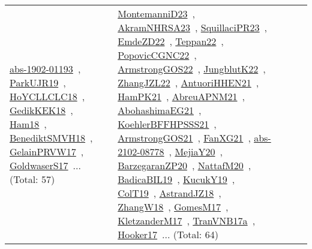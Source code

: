 {\begin{longtable}{lp{3cm}>{\raggedright\arraybackslash}p{6cm}>{\raggedright\arraybackslash}p{6cm}>{\raggedright\arraybackslash}p{8cm}}
\href{works/abs-1902-01193.pdf}{abs-1902-01193}~\cite{abs-1902-01193}, \href{works/ParkUJR19.pdf}{ParkUJR19}~\cite{ParkUJR19}, \href{works/HoYCLLCLC18.pdf}{HoYCLLCLC18}~\cite{HoYCLLCLC18}, \href{works/GedikKEK18.pdf}{GedikKEK18}~\cite{GedikKEK18}, \href{works/Ham18.pdf}{Ham18}~\cite{Ham18}, \href{works/BenediktSMVH18.pdf}{BenediktSMVH18}~\cite{BenediktSMVH18}, \href{works/GelainPRVW17.pdf}{GelainPRVW17}~\cite{GelainPRVW17}, \href{works/GoldwaserS17.pdf}{GoldwaserS17}~\cite{GoldwaserS17}... (Total: 57) & \href{works/MontemanniD23.pdf}{MontemanniD23}~\cite{MontemanniD23}, \href{works/AkramNHRSA23.pdf}{AkramNHRSA23}~\cite{AkramNHRSA23}, \href{works/SquillaciPR23.pdf}{SquillaciPR23}~\cite{SquillaciPR23}, \href{works/EmdeZD22.pdf}{EmdeZD22}~\cite{EmdeZD22}, \href{works/Teppan22.pdf}{Teppan22}~\cite{Teppan22}, \href{works/PopovicCGNC22.pdf}{PopovicCGNC22}~\cite{PopovicCGNC22}, \href{works/ArmstrongGOS22.pdf}{ArmstrongGOS22}~\cite{ArmstrongGOS22}, \href{works/JungblutK22.pdf}{JungblutK22}~\cite{JungblutK22}, \href{works/ZhangJZL22.pdf}{ZhangJZL22}~\cite{ZhangJZL22}, \href{works/AntuoriHHEN21.pdf}{AntuoriHHEN21}~\cite{AntuoriHHEN21}, \href{works/HamPK21.pdf}{HamPK21}~\cite{HamPK21}, \href{works/AbreuAPNM21.pdf}{AbreuAPNM21}~\cite{AbreuAPNM21}, \href{works/AbohashimaEG21.pdf}{AbohashimaEG21}~\cite{AbohashimaEG21}, \href{works/KoehlerBFFHPSSS21.pdf}{KoehlerBFFHPSSS21}~\cite{KoehlerBFFHPSSS21}, \href{works/ArmstrongGOS21.pdf}{ArmstrongGOS21}~\cite{ArmstrongGOS21}, \href{works/FanXG21.pdf}{FanXG21}~\cite{FanXG21}, \href{works/abs-2102-08778.pdf}{abs-2102-08778}~\cite{abs-2102-08778}, \href{works/MejiaY20.pdf}{MejiaY20}~\cite{MejiaY20}, \href{works/BarzegaranZP20.pdf}{BarzegaranZP20}~\cite{BarzegaranZP20}, \href{works/NattafM20.pdf}{NattafM20}~\cite{NattafM20}, \href{works/BadicaBIL19.pdf}{BadicaBIL19}~\cite{BadicaBIL19}, \href{works/KucukY19.pdf}{KucukY19}~\cite{KucukY19}, \href{works/ColT19.pdf}{ColT19}~\cite{ColT19}, \href{works/AstrandJZ18.pdf}{AstrandJZ18}~\cite{AstrandJZ18}, \href{works/ZhangW18.pdf}{ZhangW18}~\cite{ZhangW18}, \href{works/GomesM17.pdf}{GomesM17}~\cite{GomesM17}, \href{works/KletzanderM17.pdf}{KletzanderM17}~\cite{KletzanderM17}, \href{works/TranVNB17a.pdf}{TranVNB17a}~\cite{TranVNB17a}, \href{works/Hooker17.pdf}{Hooker17}~\cite{Hooker17}... (Total: 64)\\

\end{longtable}}
